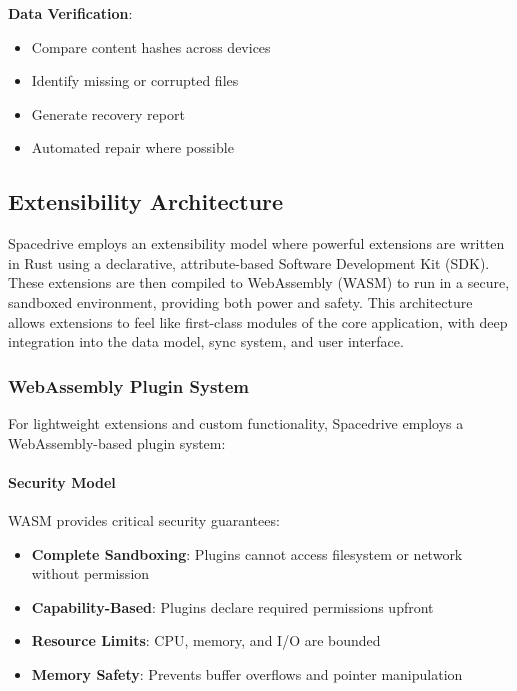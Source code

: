 \documentclass[sigconf]{acmart}
\begin{document}
\textbf{Data Verification}:
\begin{itemize}[noitemsep, topsep=0pt]
\item Compare content hashes across devices
\item Identify missing or corrupted files
\item Generate recovery report
\item Automated repair where possible
\end{itemize}

\subsection{Extensibility Architecture}

Spacedrive employs an extensibility model where powerful extensions are written in Rust using a declarative, attribute-based Software Development Kit (SDK). These extensions are then compiled to WebAssembly (WASM) to run in a secure, sandboxed environment, providing both power and safety. This architecture allows extensions to feel like first-class modules of the core application, with deep integration into the data model, sync system, and user interface.

\subsubsection{WebAssembly Plugin System}

For lightweight extensions and custom functionality, Spacedrive employs a WebAssembly-based plugin system:

\paragraph{Security Model}
WASM provides critical security guarantees:
\begin{itemize}
    \item \textbf{Complete Sandboxing}: Plugins cannot access filesystem or network without permission
    \item \textbf{Capability-Based}: Plugins declare required permissions upfront
    \item \textbf{Resource Limits}: CPU, memory, and I/O are bounded
    \item \textbf{Memory Safety}: Prevents buffer overflows and pointer manipulation
\end{itemize}
\end{document}
